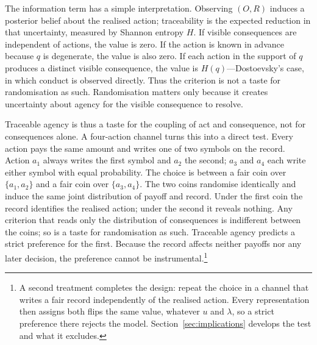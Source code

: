 \documentclass[11pt,a4paper]{article}
\theoremstyle{definition}
\newcommand{\Sh}{H}
\newcommand{\1}{\mathbf 1}
\begin{document}
The information term has a simple interpretation.  Observing $(O,R)$ induces a posterior belief about the realised
action; traceability is the expected reduction in that uncertainty, measured by Shannon entropy $\Sh$.  If visible
consequences are independent of actions, the value is zero.  If the action is known in advance because
$q$ is degenerate, the value is also zero.  If each action in the support of $q$ produces a distinct visible
consequence, the value is $\Sh(q)$---Dostoevsky's case, in which conduct is observed directly.  Thus the criterion is
not a taste for randomisation as such.  Randomisation matters only because it creates uncertainty about agency for the
visible consequence to resolve.

Traceable agency is thus a taste for the coupling of act and consequence, not for consequences alone.  A
four-action channel turns this into a direct test.  Every action pays the same amount and writes one of two
symbols on the record.  Action $a_1$ always writes the first symbol and $a_2$ the second; $a_3$ and $a_4$ each
write either symbol with equal probability.  The choice is between a fair coin over $\{a_1,a_2\}$ and a fair
coin over $\{a_3,a_4\}$.  The two coins randomise identically and induce the same joint distribution of payoff
and record.  Under the first coin the record identifies the realised action; under the second it reveals
nothing.  Any criterion that reads only the distribution of consequences is indifferent between the coins; so is
a taste for randomisation as such.  Traceable agency predicts a strict preference for the first.  Because the
record affects neither payoffs nor any later decision, the preference cannot be
instrumental.\footnote{A second treatment completes the design: repeat
the choice in a channel that writes a fair record independently of the realised action.  Every representation
then assigns both flips the same value, whatever $u$ and $\lambda$, so a strict preference there rejects the
model.  Section~\ref{sec:implications} develops the test and what it excludes.}
\end{document}
